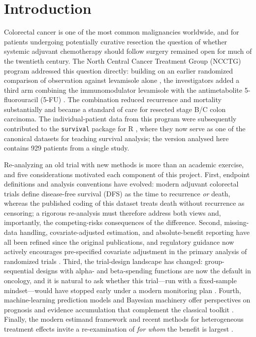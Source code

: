 \section{Introduction}\label{sec:intro}

Colorectal cancer is one of the most common malignancies worldwide, and
for patients undergoing potentially curative resection the question of
whether systemic adjuvant chemotherapy should follow surgery remained
open for much of the twentieth century. The North Central Cancer
Treatment Group (NCCTG) program addressed this question directly:
building on an earlier randomized comparison of observation against
levamisole alone \citep{laurie1989}, the investigators added a third arm
combining the immunomodulator levamisole with the antimetabolite
5-fluorouracil (5-FU) \citep{moertel1990}. The combination reduced
recurrence and mortality substantially and became a standard of care for
resected stage B/C colon carcinoma. The individual-patient data from
this program were subsequently contributed to the \texttt{survival}
package for R \citep{therneau2026}, where they now serve as one of the
canonical datasets for teaching survival analysis; the version analysed
here contains 929 patients from a single study.

Re-analyzing an old trial with new methods is more than an academic
exercise, and five considerations motivated each component of this
project. First, endpoint definitions and analysis conventions have
evolved: modern adjuvant colorectal trials define disease-free survival
(DFS) as the time to recurrence \emph{or} death, whereas the published
coding of this dataset treats death without recurrence as censoring; a
rigorous re-analysis must therefore address both views and, importantly,
the competing-risks consequences of the difference. Second, missing-data
handling, covariate-adjusted estimation, and absolute-benefit reporting
have all been refined since the original publications, and regulatory
guidance now actively encourages pre-specified covariate adjustment in
the primary analysis of randomized trials
\citep{fda2023,kahan2014,sterne2009}. Third, the trial-design landscape
has changed: group-sequential designs with alpha- and beta-spending
functions are now the default in oncology, and it is natural to ask
whether this trial---run with a fixed-sample mindset---would have
stopped early under a modern monitoring plan
\citep{landemets1983,o1979}. Fourth, machine-learning prediction models
and Bayesian machinery offer perspectives on prognosis and evidence
accumulation that complement the classical toolkit
\citep{harrell2015,gelman2013}. Finally, the modern estimand framework
and recent methods for heterogeneous treatment effects invite a
re-examination of \emph{for whom} the benefit is largest
\citep{hernan2020}.

